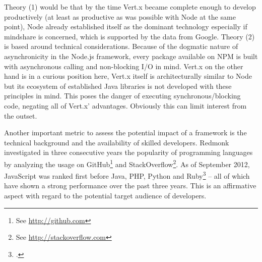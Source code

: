 Theory (1) would be that by the time Vert.x became complete enough to develop productively (at least as productive as was possible with Node at the same point), Node already established itself as the dominant technology especially if mindshare is concerned, which is supported by the data from Google.
Theory (2) is based around technical considerations. Because of the dogmatic nature of asynchronicity in the Node.js framework, every package available on NPM is built with asynchronous calling and non-blocking I/O in mind. Vert.x on the other hand is in a curious position here, Vert.x itself is architecturally similar to Node but its ecosystem of established Java libraries is not developed with these principles in mind. This poses the danger of executing synchronous/blocking code, negating all of Vert.x' advantages. Obviously this can limit interest from the outset.

Another important metric to assess the potential impact of a framework is the technical background and the availability of skilled developers. Redmonk investigated in three consecutive years the popularity of programming languages by analyzing the usage on GitHub\footnote{See \url{http://github.com}} and StackOverflow\footnote{See \url{http://stackoverflow.com}}. As of September 2012, JavaScript was ranked first before Java, PHP, Python and Ruby\footcite[Cf.][]{Redmonk_2012} – all of which have shown a strong performance over the past three years. This is an affirmative aspect with regard to the potential target audience of developers.

